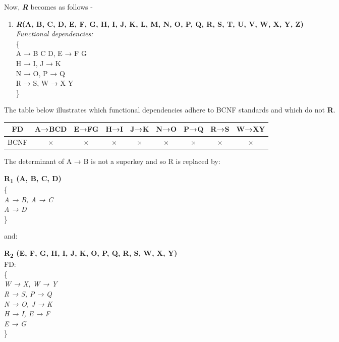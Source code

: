 Now, \textbf{\emph{R}} becomes as follows -\\
\begin{enumerate}
\item \textbf{\emph{R}(A, B, C, D, E, F, G, H, I, J, K, L, M, N, O, P, Q, R, S, T, U, V, W, X, Y, Z)}\\
\textit{Functional dependencies:}\\
\{\\
\hspace{1cm} A → B C D, E → F G\\
\hspace{1cm} H → I, J → K\\
\hspace{1cm} N → O, P → Q\\
\hspace{1cm} R → S, W → X Y\\
\}
\end{enumerate}

The table below illustrates which functional dependencies adhere to BCNF standards and which do not \textbf{R}.


\begin{center}
\begin{tabular}{ |c|c|c|c|c|c|c|c|c| }
\hline
 FD&A→BCD&E→FG&H→I&J→K&N→O&P→Q&R→S&W→XY\\ 
\hline
BCNF&$\times$&$\times$&$\times$&$\times$&$\times$&$\times$&$\times$&$\times$ \\ \hline
\end{tabular}
\end{center}

The determinant of A → B is not a superkey and so R is replaced by:\\

\begin{adjustwidth}{2cm}{}
\textbf{R\textsubscript{1} (A, B, C, D)}\\
\{\\ 
\textit{
A → B, A → C\\
A → D\\
} 
\}\\
\end{adjustwidth} 
and:\\ 

\begin{adjustwidth}{2cm}{}
\textbf{R\textsubscript{2} (E, F, G, H, I, J, K, O, P, Q, R, S, W, X, Y)}\\
FD:\\ 
\{ \\ 
\textit{
W → X, W → Y\\
R → S, P → Q\\
N → O, J → K\\
H → I, E → F\\
E → G\\
}
\}\\ \\
\end{adjustwidth} 



